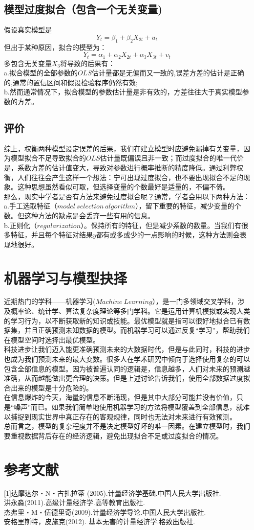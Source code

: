\documentclass[12pt,a4paper]{article}
\begin{document}
\subsection{模型过度拟合（包含一个无关变量)}
\noindent
假设真实模型是
$$Y_{t}=\beta_{1}+\beta_{2}X_{2t}+u_{t}$$
但出于某种原因，拟合的模型为：
$$Y_{t}=\alpha_{1}+\alpha_{2}X_{2t}+\alpha_{3}X_{3t}+v_{t}$$
\noindent
多包含无关变量$X_{3}$将导致的后果有：\\
\indent
a.拟合模型的全部参数的$OLS$估计量都是无偏而又一致的,误差方差的估计是正确的,通常的置信区间和假设检验程序仍然有效;\\
\indent
b.然而通常情况下，拟合模型的参数估计量是非有效的，方差往往大于真实模型参数的方差。
\subsection{评价}
\indent
综上，权衡两种模型设定误差的后果，我们在建立模型时应避免漏掉有关变量，因为模型拟合不足导致拟合的$OLS$估计量既偏误且非一致；而过度拟合的唯一代价是，系数方差的估计值变大，导致对参数进行概率推断的精度降低。通过利弊权衡，人们往往会产生这样一个想法：宁可出现过度拟合，也不要出现拟合不足的现象。这种思想虽然看似可取，但选择变量的个数最好是适量的，不偏不倚。\\
\indent
那么，现实中学者是否有方法来避免过度拟合呢？通常，学者会用以下两种方法：\\
\indent
a.手工选取特征（$model\ selection\ algorithm$），留下重要的特征，减少变量的个数。但这种方法的缺点是会丢弃一些有用的信息。\\
\indent
b.正则化（$regularization$）。保持所有的特征，但是减少系数的数量。当我们有很多特征，并且每个特征对结果$y$都有或多或少的一点影响的时候，这种方法则会表现地很好。
 \section{机器学习与模型抉择}
\indent
近期热门的学科——机器学习($Machine\  Learning$），是一门多领域交叉学科，涉及概率论、统计学、算法复杂度理论等多门学科。它是运用计算机模拟或实现人类的学习行为，以不断获取新的知识或技能。最优模型就是指可以很好地拟合已有数据集，并且正确预测未知数据的模型。而机器学习可以通过反复“学习”，帮助我们在模型空间时选择出最优模型。\\
\indent
科技进步让我们迈入能更准确预测未来的大数据时代，但是与此同时，科技的进步也成为我们预测未来的最大变数。很多人在学术研究中倾向于选择使用复杂的可以包含全部信息的模型。因为被普遍认同的逻辑是，信息越多，人们对未来的预测越准确，从而越能做出更合理的决策。但是上述讨论告诉我们，使用全部数据过度拟合出来的模型是十分危险的。\\
\indent
在信息爆炸的今天，海量的信息不断涌现，但是其中大部分可能并没有价值，只是“噪声”而已。如果我们简单地使用机器学习的方法将模型覆盖到全部信息，就难以捕捉到现实世界中真正存在的客观规律，同时也无法对未来进行有效预测。\\
\indent
总而言之，模型的复杂程度并不是决定模型好坏的唯一因素。在建立模型时，我们要重视数据背后存在的经济逻辑，避免出现拟合不足或过度拟合的情况。
\section{参考文献}
[1]达摩达尔・N・古扎拉蒂 (2005).计量经济学基础.中国人民大学出版社.\\
\indent
[2]洪永淼(2011).高级计量经济学.高等教育出版社.\\
\indent
[3]杰弗里・M・伍德里奇(2009).计量经济学导论.中国人民大学出版社.\\
\indent
[4]安格里斯特，皮施克(2012). 基本无害的计量经济学.格致出版社.
\end{document}
